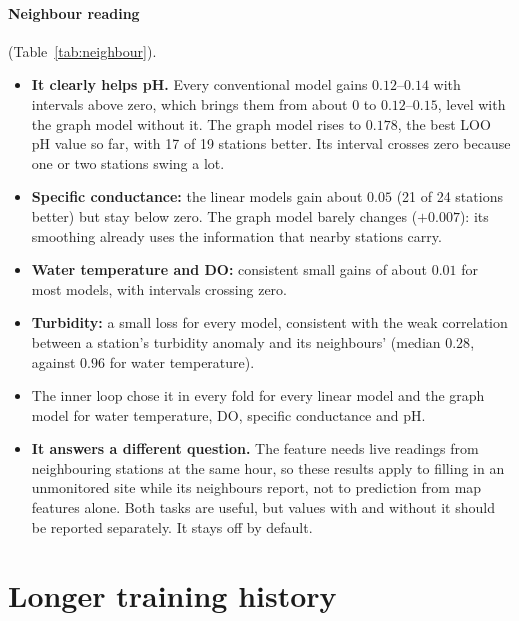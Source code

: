 \documentclass[11pt]{article}
\begin{document}
\paragraph{Neighbour reading} (Table~\ref{tab:neighbour}).
\begin{itemize}
  \item \textbf{It clearly helps pH.} Every conventional model gains $0.12$--$0.14$ with intervals
        above zero, which brings them from about $0$ to $0.12$--$0.15$, level with the graph
        model without it. The graph model rises to $0.178$, the best LOO pH value so far, with 17
        of 19 stations better. Its interval crosses zero because one or two stations swing a lot.
  \item \textbf{Specific conductance:} the linear models gain about $0.05$ (21 of 24 stations
        better) but stay below zero. The graph model barely changes ($+0.007$): its smoothing
        already uses the information that nearby stations carry.
  \item \textbf{Water temperature and DO:} consistent small gains of about $0.01$ for most
        models, with intervals crossing zero.
  \item \textbf{Turbidity:} a small loss for every model, consistent with the weak correlation
        between a station's turbidity anomaly and its neighbours' (median $0.28$, against $0.96$ for
        water temperature).
  \item The inner loop chose it in every fold for every linear model and the graph model for water
        temperature, DO, specific conductance and pH.
  \item \textbf{It answers a different question.} The feature needs live readings from neighbouring
        stations at the same hour, so these results apply to filling in an unmonitored site while
        its neighbours report, not to prediction from map features alone. Both tasks are useful,
        but values with and without it should be reported separately. It stays off by default.
\end{itemize}

\section{Longer training history}\label{sec:history}
\end{document}
